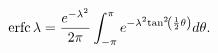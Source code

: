\[\mathop{\mathrm{erfc}\/}\nolimits\lambda=\frac{e^{-\lambda^{2}}}{2\pi}\int_{-%
\pi}^{\pi}e^{-\lambda^{2}{\mathop{\tan\/}\nolimits^{2}}\!\left(\frac{1}{2}%
\theta\right)}d\theta.\]
